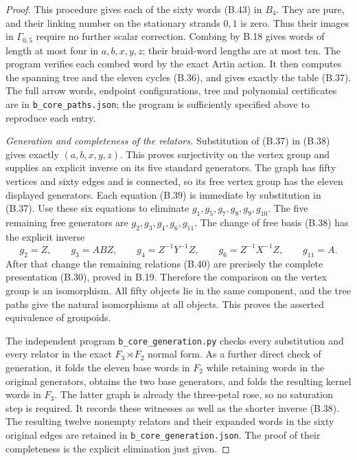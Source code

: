 \begin{proof}
This procedure gives each of the sixty words (B.43) in
$B_4$.  They are pure, and their linking number on the
stationary strands $0,1$ is zero.  Thus their images in
$\Gamma_{0,5}$ require no further scalar correction.
Combing by B.18 gives words of length at most four in
$a,b,x,y,z$; their braid-word lengths are at most ten.
The program verifies each combed word by the exact Artin
action.  It then computes the spanning tree and the eleven
cycles (B.36), and gives exactly the table (B.37).
The full arrow words, endpoint configurations, tree and
polynomial certificates are in
\texttt{b\_core\_paths.json}; the program is sufficiently
specified above to reproduce each entry.

\emph{Generation and completeness of the relators.}
Substitution of (B.37) in (B.38) gives exactly
$(a,b,x,y,z)$.  This proves surjectivity on the vertex
group and supplies an explicit inverse on its five
standard generators.  The graph has fifty vertices and
sixty edges and is connected, so its free vertex group
has the eleven displayed generators.  Each equation
(B.39) is immediate by substitution in (B.37).
Use these six equations to eliminate
$g_1,g_5,g_7,g_8,g_9,g_{10}$.  The five remaining free
generators are $g_2,g_3,g_4,g_6,g_{11}$.
The change of free basis (B.38) has the explicit inverse
\[
 g_2=Z,\qquad g_3=ABZ,\qquad
 g_4=Z^{-1}Y^{-1}Z,\qquad
 g_6=Z^{-1}X^{-1}Z,\qquad g_{11}=A.
\]
After that change the remaining relations (B.40) are
precisely the complete presentation (B.30), proved in
B.19.  Therefore the comparison on the vertex group is
an isomorphism.  All fifty objects lie in the same component,
and the tree paths give the natural isomorphisms at all
objects.  This proves the asserted equivalence of groupoids.

The independent program \texttt{b\_core\_generation.py}
checks every substitution and every relator in the exact
$F_3\rtimes F_2$ normal form.  As a further direct check
of generation, it folds the eleven base words in $F_2$
while retaining words in the original generators, obtains
the two base generators, and folds the resulting kernel
words in $F_3$.  The latter graph is already the
three-petal rose, so no saturation step is required.
It records these witnesses as well as the shorter inverse
(B.38).  The resulting twelve nonempty relators and their
expanded words in the sixty original edges are retained
in \texttt{b\_core\_generation.json}.  The proof of their
completeness is the explicit elimination just given.
\end{proof}

